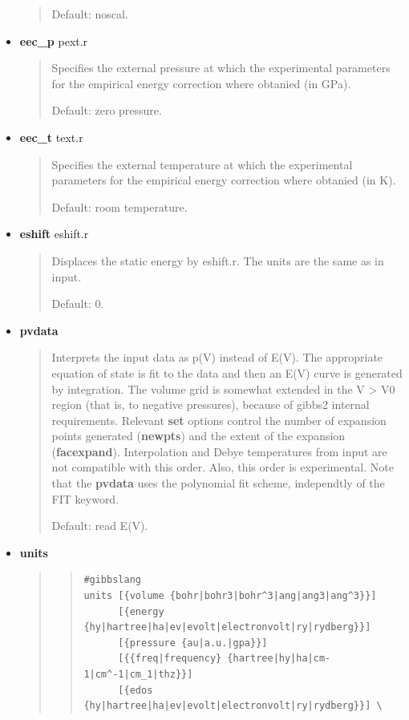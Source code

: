 \documentclass[a4paper]{article}
\begin{document}
\begin{itemize}
\begin{quote}
Default: noscal.

\end{quote}

\item \textbf{eec\_p} pext.r
%
\begin{quote}

Specifies the external pressure at which the experimental
parameters for the empirical energy correction where obtanied (in
GPa).

Default: zero pressure.

\end{quote}

\item \textbf{eec\_t} text.r
%
\begin{quote}

Specifies the external temperature at which the experimental
parameters for the empirical energy correction where obtanied (in
K).

Default: room temperature.

\end{quote}

\item \textbf{eshift} eshift.r
%
\begin{quote}

Displaces the static energy by eshift.r. The units are the same as
in input.

Default: 0.

\end{quote}

\item \textbf{pvdata}
%
\begin{quote}

Interprets the input data as p(V) instead of E(V). The appropriate
equation of state is fit to the data and then an E(V) curve is
generated by integration. The volume grid is somewhat extended in
the V > V0 region (that is, to negative pressures), because of
gibbs2 internal requirements. Relevant \textbf{set} options control the
number of expansion points generated (\textbf{newpts}) and the extent of
the expansion (\textbf{facexpand}). Interpolation and Debye temperatures
from input are not compatible with this order. Also, this order is
experimental. Note that the \textbf{pvdata} uses the polynomial fit
scheme, independtly of the FIT keyword.

Default: read E(V).

\end{quote}

\item \textbf{units}
%
\begin{quote}
%
\begin{quote}
\begin{verbatim}
#gibbslang
units [{volume {bohr|bohr3|bohr^3|ang|ang3|ang^3}}]
      [{energy {hy|hartree|ha|ev|evolt|electronvolt|ry|rydberg}}]
      [{pressure {au|a.u.|gpa}}]
      [{{freq|frequency} {hartree|hy|ha|cm-1|cm^-1|cm_1|thz}}]
      [{edos {hy|hartree|ha|ev|evolt|electronvolt|ry|rydberg}}] \
\end{verbatim}
\end{quote}


\end{quote}
\end{itemize}
\end{document}
